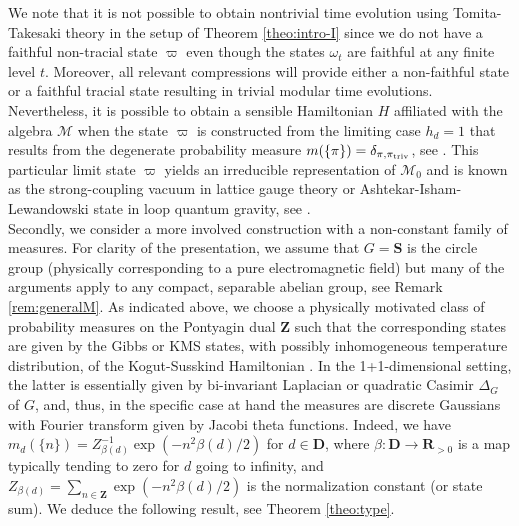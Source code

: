 \documentclass[a4paper,12pt]{amsart}
\numberwithin{equation}{section}
\theoremstyle{definition}
\newcommand{\D}{\mathbf D}
\newcommand{\scrM}{\mathscr M}
\newcommand{\R}{\mathbf{R}}
\newcommand{\fS}{\mathbf{S}}
\newcommand{\utriv}{\textup{triv}}
\newcommand{\Z}{\mathbf{Z}}
\begin{document}
We note that it is not possible to obtain nontrivial time evolution using Tomita-Takesaki theory in the setup of Theorem \ref{theo:intro-I} since we do not have a faithful non-tracial state $\varpi$ even though the states $\omega_{t}$ are faithful at any finite level $t$. Moreover, all relevant compressions will provide either a non-faithful state or a faithful tracial state resulting in trivial modular time evolutions. Nevertheless, it is possible to obtain a sensible Hamiltonian $H$ affiliated with the algebra $\scrM$ when the state $\varpi$ is constructed from the limiting case $h_{d} = 1$ that results from the degenerate probability measure $m(\{\pi\}) = \delta_{\pi,\pi_{\utriv}}$, see {\cite[Section 3.4]{Brot-Stottmeister-Phys}}. This particular limit state $\varpi$ yields an irreducible representation of $\scrM_{0}$ and is known as the strong-coupling vacuum in lattice gauge theory or Ashtekar-Isham-Lewandowski state in loop quantum gravity, see \cite{Kogut-83-Lattice-Gauge, Ashtekar-Lewandowski-94-Representation-Theory}. \\[0.1cm]
Secondly, we consider a more involved construction with a non-constant family of measures.
For clarity of the presentation, we assume that $G=\fS$ is the circle group (physically corresponding to a pure electromagnetic field) but many of the arguments apply to any compact, separable abelian group, see Remark \ref{rem:generalM}.
As indicated above, we choose a physically motivated class of probability measures on the Pontyagin dual $\Z$ such that the corresponding states are given by the Gibbs or KMS states, with possibly inhomogeneous temperature distribution, of the Kogut-Susskind Hamiltonian \cite{Kogut-Susskind75}. In the 1+1-dimensional setting, the latter is essentially given by bi-invariant Laplacian or quadratic Casimir $\Delta_{G}$ of $G$, and, thus, in the specific case at hand the measures are discrete Gaussians with Fourier transform given by Jacobi theta functions.
Indeed, we have $m_d(\{n\}) = Z_{\beta(d)}^{-1} \exp(-n^2 \beta(d)/2)$ for $d\in\D$, where $\beta:\D\to \R_{>0}$ is a map typically tending to zero for $d$ going to infinity, and $Z_{\beta(d)}=\sum_{n\in\Z}\exp(-n^2 \beta(d)/2)$ is the normalization constant (or state sum). 
We deduce the following result, see Theorem \ref{theo:type}.
\end{document}
